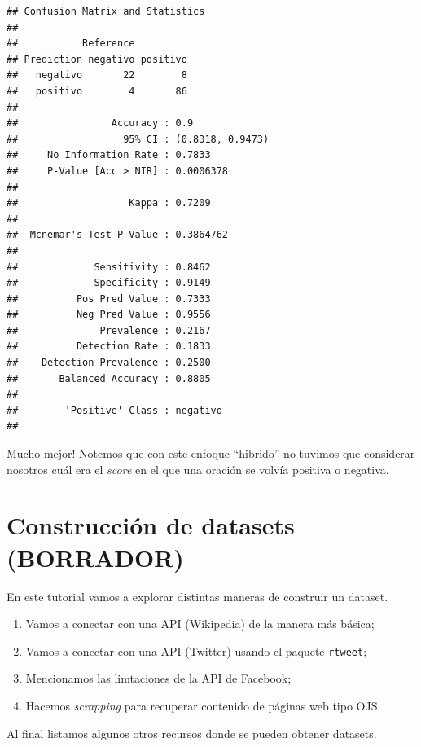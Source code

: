 \documentclass[
]{book}
\providecommand{\tightlist}{%
  \setlength{\itemsep}{0pt}\setlength{\parskip}{0pt}}
\begin{document}
\begin{verbatim}
## Confusion Matrix and Statistics
## 
##           Reference
## Prediction negativo positivo
##   negativo       22        8
##   positivo        4       86
##                                           
##                Accuracy : 0.9             
##                  95% CI : (0.8318, 0.9473)
##     No Information Rate : 0.7833          
##     P-Value [Acc > NIR] : 0.0006378       
##                                           
##                   Kappa : 0.7209          
##                                           
##  Mcnemar's Test P-Value : 0.3864762       
##                                           
##             Sensitivity : 0.8462          
##             Specificity : 0.9149          
##          Pos Pred Value : 0.7333          
##          Neg Pred Value : 0.9556          
##              Prevalence : 0.2167          
##          Detection Rate : 0.1833          
##    Detection Prevalence : 0.2500          
##       Balanced Accuracy : 0.8805          
##                                           
##        'Positive' Class : negativo        
## 
\end{verbatim}

Mucho mejor! Notemos que con este enfoque ``hibrido'' no tuvimos que considerar nosotros cuál era el \emph{score} en el que una oración se volvía positiva o negativa.

\hypertarget{construcciuxf3n-de-datasets-borrador}{%
\chapter{Construcción de datasets (BORRADOR)}\label{construcciuxf3n-de-datasets-borrador}}

En este tutorial vamos a explorar distintas maneras de construir un dataset.

\begin{enumerate}
\def\labelenumi{\arabic{enumi}.}
\tightlist
\item
  Vamos a conectar con una API (Wikipedia) de la manera más básica;
\item
  Vamos a conectar con una API (Twitter) usando el paquete \texttt{rtweet};
\item
  Mencionamos las limtaciones de la API de Facebook;
\item
  Hacemos \emph{scrapping} para recuperar contenido de páginas web tipo OJS.
\end{enumerate}

Al final listamos algunos otros recursos donde se pueden obtener datasets.
\end{document}
